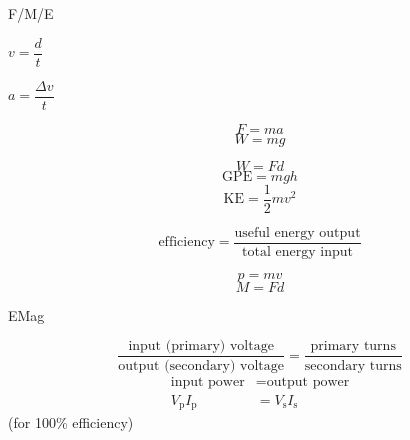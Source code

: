 \documentclass[11pt,a4paper]{article}
\begin{document}
\noindent\begin{paracol}{3}
F/M/E 
\switchcolumn 
\begin{center}
$v = \dfrac{d}{t}$
\end{center}
\switchcolumn
\begin{center}
$a = \dfrac{\Delta v}{t}$
\end{center}
\end{paracol}

\vspace*{1em}

\noindent\begin{paracol}{4}

\switchcolumn 
\[F = ma\]
\switchcolumn
\[W=mg\]
\end{paracol}

\vspace*{1em}

\noindent\begin{paracol}{4}

\switchcolumn 
\[W = Fd\]
\switchcolumn
\[\text{GPE}=mgh\]
\switchcolumn
\[\text{KE}=\frac{1}{2}mv^{2}\]
\end{paracol}

\vspace*{1em}

\noindent\begin{paracol}{2}

\switchcolumn 
\[\text{efficiency} = \frac{\text{useful energy output}}{\text{total energy input}}\]
\end{paracol}

\vspace*{1em}

\noindent\begin{paracol}{3}

\switchcolumn 
\[p=mv\]
\switchcolumn
\[M=Fd\]
\end{paracol}


\vspace*{1em}

\hrulefill

\vspace*{1em}

EMag

\begin{paracol}{2}
\[\frac{\text{input (primary) voltage}}{\text{output (secondary) voltage}}=\frac{\text{primary turns}}{\text{secondary turns}}\]
\switchcolumn
\begin{align*}
\text{input power}&=\text{output power}\\
V_{\text{p}}I_{\text{p}}&=V_{\text{s}}I_{\text{s}}
\end{align*}
(for 100\% efficiency)
\end{paracol}
\end{document}
